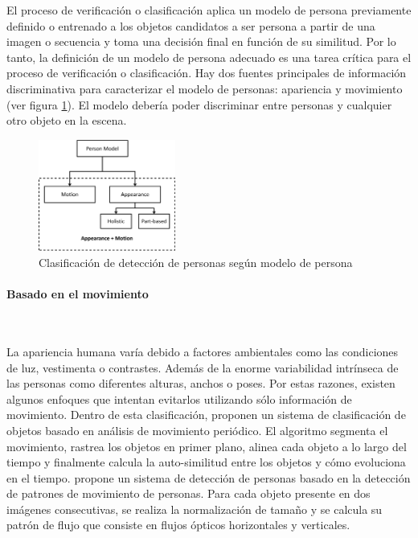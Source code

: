El proceso de verificación o clasificación aplica un modelo de persona previamente definido o entrenado a los objetos candidatos a ser persona a partir de una imagen o secuencia y toma una decisión final en función de su similitud. Por lo tanto, la definición de un modelo de persona adecuado es una tarea crítica para el proceso de verificación o clasificación. Hay dos fuentes principales de información discriminativa para caracterizar el modelo de personas: apariencia y movimiento (ver figura \ref{fig:people-detection-people-model}). El modelo debería poder discriminar entre personas y cualquier otro objeto en la escena.

\begin{figure}[ht]
\centering
\includegraphics[width=0.4\textwidth]{img/chapters/estado-del-arte/people-detection-people-model.png}
\caption{\label{fig:people-detection-people-model}Clasificación de detección de personas según modelo de persona \cite{https://doi.org/10.1049/iet-cvi.2014.0148}}
\end{figure}

\paragraph*{Basado en el movimiento}\mbox{} \\
\label{parag:basado-movimiento-people-model}

La apariencia humana varía debido a factores ambientales como las condiciones de luz, vestimenta o contrastes. Además de la enorme variabilidad intrínseca de las personas como diferentes alturas, anchos o poses. Por estas razones, existen algunos enfoques que intentan evitarlos utilizando sólo información de movimiento. Dentro de esta clasificación, \cite{868681} proponen un sistema de clasificación de objetos basado en análisis de movimiento periódico. El algoritmo segmenta el movimiento, rastrea los objetos en primer plano, alinea cada objeto a lo largo del tiempo y finalmente calcula la auto-similitud entre los objetos y cómo evoluciona en el tiempo. \cite{1334092} propone un sistema de detección de personas basado en la detección de patrones de movimiento de personas. Para cada objeto presente en dos imágenes consecutivas, se realiza la normalización de tamaño y se calcula su patrón de flujo que consiste en flujos ópticos horizontales y verticales.

